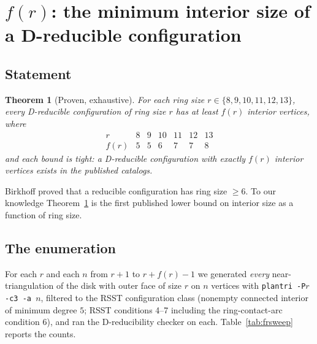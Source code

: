 \documentclass[11pt]{article}
\newtheorem{theorem}{Theorem}[section]
\theoremstyle{definition}
\begin{document}
\section{$f(r)$: the minimum interior size of a D-reducible configuration}
\label{sec:fr}

\subsection{Statement}

\begin{theorem}[Proven, exhaustive]
\label{thm:fr}
For each ring size $r \in \{8,9,10,11,12,13\}$, every D-reducible configuration of
ring size $r$ has at least $f(r)$ interior vertices, where
\[
\begin{array}{c|cccccc}
 r & 8 & 9 & 10 & 11 & 12 & 13\\\hline
 f(r) & 5 & 5 & 6 & 7 & 7 & 8
\end{array}
\]
and each bound is tight: a D-reducible configuration with exactly $f(r)$ interior
vertices exists in the published catalogs.
\end{theorem}

Birkhoff \cite{birkhoff1913} proved that a reducible configuration has ring size
$\ge 6$. To our knowledge Theorem~\ref{thm:fr} is the first published lower bound on
interior size as a function of ring size.

\subsection{The enumeration}
\label{sec:fr-enum}

For each $r$ and each $n$ from $r+1$ to $r+f(r)-1$ we generated \emph{every}
near-triangulation of the disk with outer face of size $r$ on $n$ vertices with
\texttt{plantri -P$r$ -c3 -a $n$}, filtered to the RSST configuration class
(nonempty connected interior of minimum degree $5$; RSST conditions 4--7 including
the ring-contact-arc condition 6), and ran the D-reducibility checker on each.
Table~\ref{tab:frsweep} reports the counts.
\end{document}
